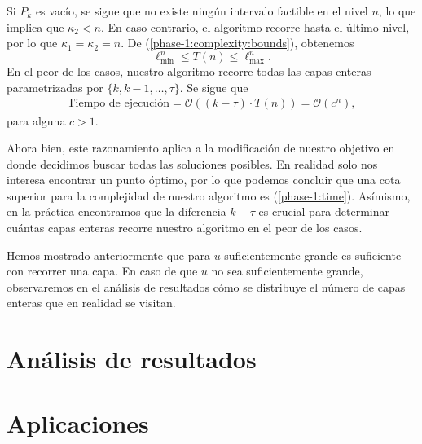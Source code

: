 Si $P_k$ es vacío, se sigue que no existe ningún intervalo factible en el nivel $n$, lo que implica
que $\kappa_2 < n$. En caso contrario, el algoritmo recorre hasta el último nivel, por lo que $\kappa_1
= \kappa_2 = n$. De (\ref{phase-1:complexity:bounds}), obtenemos
\begin{equation}
	\ell_{\min}^{n} \leq T(n) \leq \ell_{\max}^{n}.
\end{equation}
En el peor de los casos, nuestro algoritmo recorre todas las capas enteras parametrizadas por
$\lbrace k, k - 1, \ldots, \tau\rbrace$. Se sigue que
\begin{align}
	\label{phase-1:time}
	\text{Tiempo de ejecución}
	= \mathcal{O}((k - \tau) \cdot T(n))
	= \mathcal{O}(c^{n}),
\end{align}
para alguna $c > 1$.

Ahora bien, este razonamiento aplica a la modificación de nuestro objetivo en donde decidimos buscar
todas las soluciones posibles. En realidad solo nos interesa encontrar un punto óptimo, por lo que
podemos concluir que una cota superior para la complejidad de nuestro algoritmo es
(\ref{phase-1:time}). Asímismo, en la práctica encontramos que la diferencia $k - \tau$ es crucial
para determinar cuántas capas enteras recorre nuestro algoritmo en el peor de los casos.

Hemos mostrado anteriormente que para $u$ suficientemente grande es suficiente con recorrer una
capa. En caso de que $u$ no sea suficientemente grande, observaremos en el análisis de resultados
cómo se distribuye el número de capas enteras que en realidad se visitan.

\section{Análisis de resultados}

\section{Aplicaciones}
